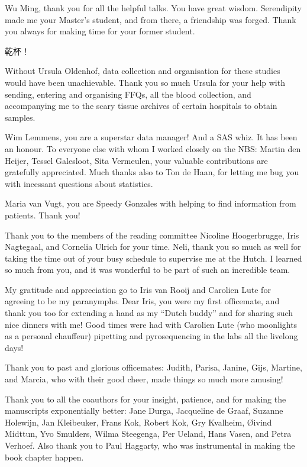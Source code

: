 \noindent Wu Ming, thank you for all the helpful talks. You have great wisdom. Serendipity made me your Master's student, and from there, a friendship was forged. Thank you always for making time for your former student. \begin{CJK}{UTF8}{gbsn} 乾杯！\end{CJK}

\noindent Without Ursula Oldenhof, data collection and organisation for these studies would have been unachievable. Thank you so much Ursula for your help with sending, entering and organising FFQs, all the blood collection, and accompanying me to the scary tissue archives of certain hospitals to obtain samples.

\noindent Wim Lemmens, you are a superstar data manager! And a SAS whiz. It has been an honour. To everyone else with whom I worked closely on the NBS: Martin den Heijer, Tessel Galesloot, Sita Vermeulen, your valuable contributions are gratefully appreciated. Much thanks also to Ton de Haan, for letting me bug you with incessant questions about statistics.

\noindent Maria van Vugt, you are Speedy Gonzales with helping to find information from patients. Thank you!

\noindent Thank you to the members of the reading committee Nicoline Hoogerbrugge, Iris Nagtegaal, and Cornelia Ulrich for your time. Neli, thank you so much as well for taking the time out of your busy schedule to supervise me at the Hutch. I learned so much from you, and it was wonderful to be part of such an incredible team.

\noindent My gratitude and appreciation go to Iris van Rooij and Carolien Lute for agreeing to be my paranymphs. Dear Iris, you were my first officemate, and thank you too for extending a hand as my ``Dutch buddy'' and for sharing such nice dinners with me! Good times were had with Carolien Lute (who moonlights as a personal chauffeur) pipetting and pyrosequencing in the labs all the livelong days!

\noindent Thank you to past and glorious officemates: Judith, Parisa, Janine, Gijs, Martine, and Marcia, who with their good cheer, made things so much more amusing!

\noindent Thank you to all the coauthors for your insight, patience, and for making the manuscripts exponentially better: Jane Durga, Jacqueline de Graaf, Suzanne Holewijn, Jan Kleibeuker, Frans Kok, Robert Kok, Gry Kvalheim, {\O}ivind Midttun, Yvo Smulders, Wilma Steegenga, Per Ueland, Hans Vasen, and Petra Verhoef. Also thank you to Paul Haggarty, who was instrumental in making the book chapter happen.

